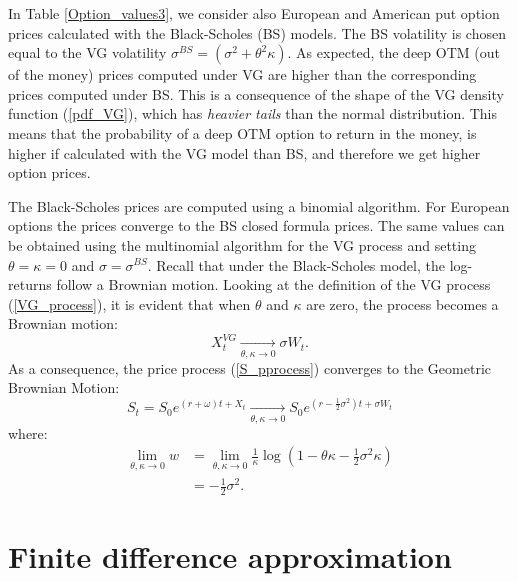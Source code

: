 \documentclass[]{interact}
\theoremstyle{plain}%
\theoremstyle{definition}
\theoremstyle{remark}
\begin{document}
In Table \ref{Option_values3}, we consider also European and American put option prices 
calculated with the Black-Scholes (BS) models.
The BS volatility is chosen equal to the VG volatility $ \sigma^{BS} = (\sigma^2 + \theta^2 \kappa)$.
As expected, the deep OTM (out of the money) prices computed under VG are higher than the corresponding prices computed under BS. This is a consequence of the
shape of the VG density function (\ref{pdf_VG}), which has \emph{heavier tails} than the normal distribution. This means that the probability of a deep OTM option to return in the money, 
is higher if calculated with the VG model than BS, and therefore we get higher option prices.

The Black-Scholes prices are computed using a binomial algorithm. For European options the prices converge to the BS closed formula prices. 
The same values can be obtained using the multinomial algorithm for the VG process and setting $\theta = \kappa = 0$ and $\sigma = \sigma^{BS}$.
Recall that under the Black-Scholes model, the log-returns follow a Brownian motion. 
Looking at the definition of the VG process (\ref{VG_process}), it is evident that when $\theta$ and $\kappa$ are zero, the process becomes a Brownian motion:
$$ X^{VG}_t \underset{\theta,\kappa \to 0}{\to} \sigma W_t. $$
As a consequence, the price process (\ref{S_pprocess}) converges to the Geometric Brownian Motion:
$$ S_t = S_0 e^{(r+\omega)t + X_t} \underset{\theta,\kappa \to 0}{\to} S_0 e^{(r-\frac{1}{2}\sigma^2)t + \sigma W_t} $$
where:
\begin{align*}
 \lim_{\theta,\kappa \to 0} w &= \lim_{\theta,\kappa \to 0} \frac{1}{\kappa} \log(1-\theta \kappa -\frac{1}{2}\sigma^2 \kappa) \\
 &= -\frac{1}{2}\sigma^2.
\end{align*}






\section{Finite difference approximation} \label{sec5}
\end{document}
